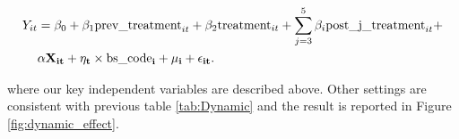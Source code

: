 \documentclass[11pt]{article}
\begin{document}
\begin{equation}
  \begin{aligned}
    Y_{it} & = \beta_0 + \beta_1 \text{prev\_treatment}_{it} + \beta_2 \text{treatment}_{it} + \sum_{j=3}^5 \beta_{i} \text{post\_j\_treatment}_{it} + \\
           & \bf{\alpha} \bf{X}_{it} + \eta_{t} \times \text{bs\_code}_i + \mu_i + \epsilon_{it}. \label{eq:acn_assessment}
  \end{aligned}
\end{equation}

where our key independent variables are described above. Other settings are consistent with previous table \ref{tab:Dynamic} and the result is reported in Figure \ref{fig:dynamic_effect}.

\begin{figure}[ht]
    \centering
    \hfill %

\end{figure}
\end{document}
